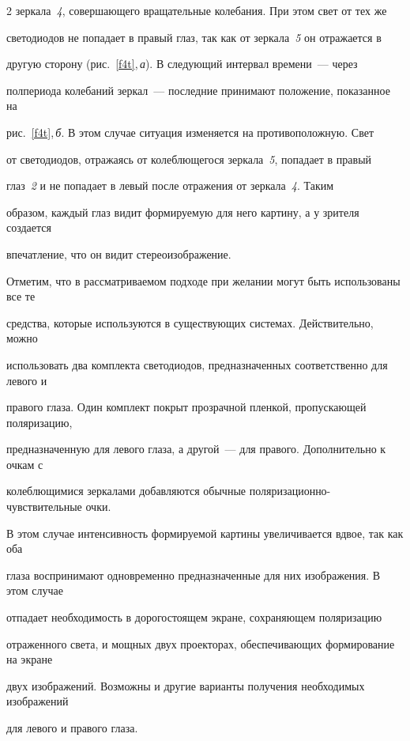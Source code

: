 \begin{multicols}{2}
зеркала~\textit{4}, совершающего вращательные колебания. При этом свет от тех же 

светодиодов не попадает в правый глаз, так как от зеркала~\textit{5} он отражается в 

другую сторону (рис.~\ref{f4t},\,\textit{а}). В следующий интервал времени~--- через 

полпериода колебаний зеркал~--- последние принимают положение, показанное на 

рис.~\ref{f4t},\,\textit{б}. В этом случае ситуация изменяется на противоположную. Свет 

от светодиодов, отражаясь от колеблющегося зеркала~\textit{5}, попадает в правый 

глаз~\textit{2} и не попадает в левый после отражения от зеркала~\textit{4}. Таким 

образом, каждый глаз видит формируемую для него картину, а у зрителя создается 

впечатление, что он видит стереоизображение.

  

  Отметим, что в рассматриваемом подходе при желании могут быть использованы все те 

средства, которые используются в существующих сис\-те\-мах. Действительно, можно 

использовать два комплекта светодиодов, предназначенных соответственно для левого и 

правого глаза. Один комплект покрыт прозрачной пленкой, пропускающей поляризацию, 

предназначенную для левого глаза, а другой~--- для правого. Дополнительно к очкам с 

колеблющимися зеркалами добавляются обычные поляризационно-чувствительные очки. 

В этом случае интенсивность формируемой картины увеличивается вдвое, так как оба 

глаза воспринимают одновременно предназначенные для них изоб\-ра\-же\-ния. В этом случае 

отпадает необходимость в дорогостоящем экране, сохраняющем поляризацию 

отраженного света, и мощных двух проекторах, обеспечивающих формирование на экране 

двух изображений. Возможны и другие варианты получения необходимых изображений 

для левого и правого глаза. 

  

  


\end{multicols}
